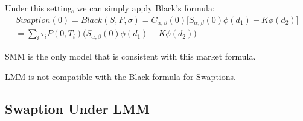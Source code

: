 Under this setting, we can simply apply Black's formula:
\begin{align*}
    Swaption(0) = Black(S, F, \sigma) = 
    C_{\alpha, \beta}(0) \bigg[S_{\alpha, \beta}(0) \phi(d_1) - K \phi(d_2)\bigg]\\
    = \sum_i \tau_i P(0, T_i) \bigg(S_{\alpha, \beta}(0) \phi(d_1) - K \phi(d_2)\bigg)
\end{align*}

\begin{remark}
    SMM is the only model that is consistent with this market formula.

    LMM is not compatible with the Black formula for Swaptions.
\end{remark}

\subsection{Swaption Under LMM}
